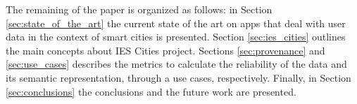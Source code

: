 The remaining of the paper is organized as follows: in Section \ref{sec:state_of_the_art} the current state of the art on apps that deal with user data in the context of smart cities is presented. Section \ref{sec:ies_cities} outlines the main concepts about IES Cities project. Sections \ref{sec:provenance} and \ref{sec:use_cases} describes the metrics to calculate the reliability of the data and its semantic representation, through a use cases, respectively. Finally, in Section \ref{sec:conclusions} the conclusions and the future work are presented.
